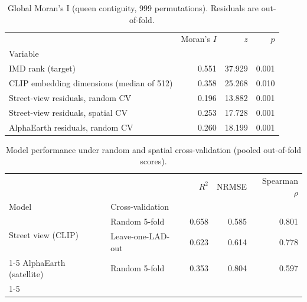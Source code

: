 \begin{table}
\caption{Global Moran's I (queen contiguity, 999 permutations). Residuals are out-of-fold.}
\label{tab:morans_i}
\begin{tabular}{lrrr}
\toprule
 & Moran's $I$ & $z$ & $p$ \\
Variable &  &  &  \\
\midrule
IMD rank (target) & 0.551 & 37.929 & 0.001 \\
CLIP embedding dimensions (median of 512) & 0.358 & 25.268 & 0.010 \\
Street-view residuals, random CV & 0.196 & 13.882 & 0.001 \\
Street-view residuals, spatial CV & 0.253 & 17.728 & 0.001 \\
AlphaEarth residuals, random CV & 0.260 & 18.199 & 0.001 \\
\bottomrule
\end{tabular}
\end{table}


\begin{table}
\caption{Model performance under random and spatial cross-validation (pooled out-of-fold scores).}
\label{tab:spatial_cv}
\begin{tabular}{llrrr}
\toprule
 &  & $R^2$ & NRMSE & Spearman $\rho$ \\
Model & Cross-validation &  &  &  \\
\midrule
\multirow[t]{2}{*}{Street view (CLIP)} & Random 5-fold & 0.658 & 0.585 & 0.801 \\
 & Leave-one-LAD-out & 0.623 & 0.614 & 0.778 \\
\cline{1-5}
AlphaEarth (satellite) & Random 5-fold & 0.353 & 0.804 & 0.597 \\
\cline{1-5}
\bottomrule
\end{tabular}
\end{table}
